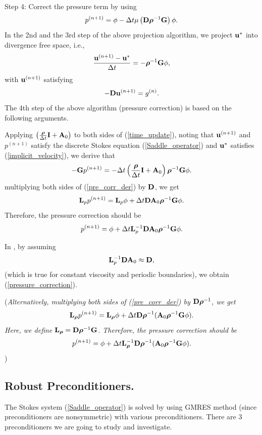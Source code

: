 \documentclass[9pt]{article}
\newcommand{\V}[1]{\boldsymbol{#1}}
\begin{document}
Step 4: Correct the pressure term by using
\begin{equation}\label{pressure_correction}
p^{(n+1)}=\phi -  \Delta t \mu  \left({\bf D} {\V{\rho}}^{-1} {\bf G} \right)\phi.
\end{equation}
In the 2nd and the 3rd step of the above projection algorithm, we project ${\bf u}^*$ into divergence free space, i.e.,
\begin{equation}\label{time_update}
\frac{{\bf u}^{(n+1)}-{\bf u}^*}{\Delta t}= -{\V{\rho}}^{-1} {\bf G} \phi,
\end{equation}
with ${\bf u}^{(n+1)}$ satisfying
$$
- {\bf D} {\bf u}^{(n+1)} = g^{(n)}.
$$
The 4th step of the above algorithm (pressure correction) is based on the following arguments.

Applying $\left( \frac{\V{\rho}}{\Delta t} {\bf I}+{\bf A}_0 \right)$ to both sides of (\ref{time_update}), noting that ${\bf u}^{(n+1)}$ and $p^{(n+1)}$ satisfy the discrete Stokes equation (\ref{Saddle_operator}) and ${\bf u}^*$ satisfies (\ref{implicit_velocity}), we derive that
\begin{equation}\label{pre_corr_der}
-{\bf G} p^{(n+1)} =- \Delta t \left( \frac{\V{\rho}}{\Delta t} {\bf I}+{\bf A}_0 \right)  {\V{\rho}}^{-1} {\bf G} \phi.
\end{equation}
multiplying both sides of (\ref{pre_corr_der}) by ${\bf D}$, we get
$$
{\bf L}_{p} p^{(n+1)}={\bf L}_{p} \phi + \Delta t {\bf D} {\bf A}_0 {\V{\rho}}^{-1} {\bf G} \phi.
$$
Therefore, the pressure correction should be
$$
p^{(n+1)}= \phi + \Delta t {\bf L}_{p}^{-1}{\bf D}{\bf A}_0 {\V{\rho}}^{-1} {\bf G} \phi.
$$

In \cite{Griffith}, by assuming
$$
{\bf L}_p^{-1} {\bf D} {\bf A}_0 \approx {\bf D},
$$
(which is true for constant viscosity and periodic boundaries), we obtain (\ref{pressure_correction}).

({\it Alternatively, multiplying both sides of (\ref{pre_corr_der}) by ${\bf D}{\V{\rho}}^{-1}$, we get
$$
{\bf L}_{\V{\rho}} p^{(n+1)}={\bf L}_{\V{\rho}} \phi + \Delta t {\bf D} {\V{\rho}}^{-1} ({\bf A}_0 {\V{\rho}}^{-1} {\bf G} \phi).
$$
Here, we define ${\bf L}_{\V{\rho}}={\bf D} \V{\rho}^{-1} {\bf G}$.
Therefore, the pressure correction should be
$$
p^{(n+1)}= \phi + \Delta t {\bf L}_{\V{\rho}}^{-1}{\bf D}{\V{\rho}}^{-1} ({\bf A}_0 {\V{\rho}}^{-1} {\bf G} \phi).
$$
})

\subsection{Robust Preconditioners.}
The Stokes system (\ref{Saddle_operator}) is solved by using GMRES method (since preconditioners are nonsymmetric) with various preconditioners. There are 3 preconditioners we are going to study and investigate.
\end{document}
